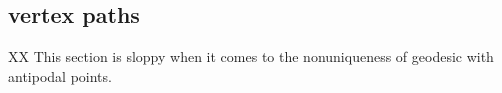 %
%
%
%
%
%
%
%
%
%

\subsection{vertex paths} %


XX This section is sloppy when it comes to the nonuniqueness of geodesic
with antipodal points.






